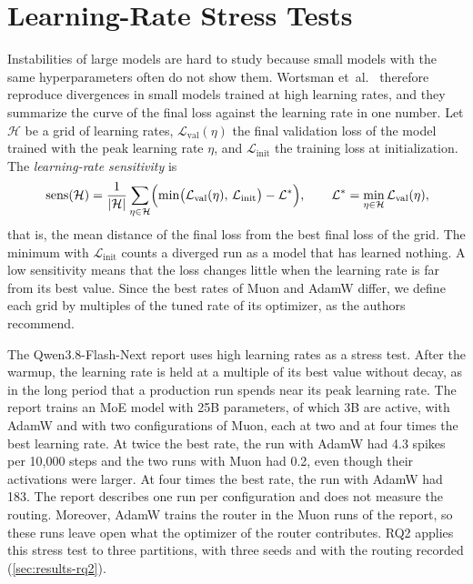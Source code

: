 \section{Learning-Rate Stress Tests}
\label{sec:related-stress}
\label{sec:related-sensitivity}
\label{sec:related-stress-test}
Instabilities of large models are hard to study because small models with the same hyperparameters often do not show them. Wortsman et~al.~\cite{wortsman2024proxies} therefore reproduce divergences in small models trained at high learning rates, and they summarize the curve of the final loss against the learning rate in one number. Let $\mathcal{H}$ be a grid of learning rates, $\mathcal{L}_{\mathrm{val}}(\eta)$ the final validation loss of the model trained with the peak learning rate $\eta$, and $\mathcal{L}_{\mathrm{init}}$ the training loss at initialization. The \emph{learning-rate sensitivity} is
\begin{equation}[eq:lr-sensitivity]{}
  \operatorname{sens}(\mathcal{H}) = \frac{1}{\lvert \mathcal{H} \rvert} \sum_{\eta \in \mathcal{H}} \Bigl( \min \bigl( \mathcal{L}_{\mathrm{val}}(\eta), \, \mathcal{L}_{\mathrm{init}} \bigr) - \mathcal{L}^{*} \Bigr), \qquad \mathcal{L}^{*} = \min_{\eta \in \mathcal{H}} \mathcal{L}_{\mathrm{val}}(\eta),
\end{equation}
that is, the mean distance of the final loss from the best final loss of the grid. The minimum with $\mathcal{L}_{\mathrm{init}}$ counts a diverged run as a model that has learned nothing. A low sensitivity means that the loss changes little when the learning rate is far from its best value. Since the best rates of Muon and AdamW differ, we define each grid by multiples of the tuned rate of its optimizer, as the authors recommend.

The Qwen3.8-Flash-Next report \cite{qiu2026qwennext} uses high learning rates as a stress test. After the warmup, the learning rate is held at a multiple of its best value without decay, as in the long period that a production run spends near its peak learning rate. The report trains an MoE model with 25B parameters, of which 3B are active, with AdamW and with two configurations of Muon, each at two and at four times the best learning rate. At twice the best rate, the run with AdamW had 4.3 spikes per 10,000 steps and the two runs with Muon had 0.2, even though their activations were larger. At four times the best rate, the run with AdamW had 183. The report describes one run per configuration and does not measure the routing. Moreover, AdamW trains the router in the Muon runs of the report, so these runs leave open what the optimizer of the router contributes. RQ2 applies this stress test to three partitions, with three seeds and with the routing recorded (\cref{sec:results-rq2}).
